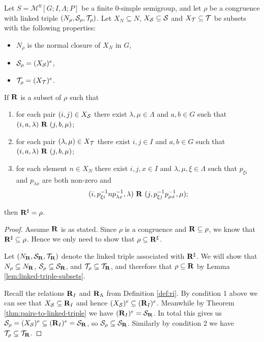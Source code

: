 \begin{theorem}
  \label{thm:linked-triple-to-pairs}
  Let $S = \mathcal{M}^0[G;I,\Lambda;P]$ be a finite 0-simple semigroup, and let
  $\rho$ be a congruence with linked triple
  $(N_\rho, \mathcal{S}_\rho, \mathcal{T}_\rho)$.
  Let $X_N \subseteq N$, $X_{\mathcal{S}} \subseteq \mathcal{S}$ and $X_{\mathcal{T}} \subseteq \mathcal{T}$ be
  subsets with the following properties:
  \begin{itemize}
  \item $N_\rho$ is the normal closure of $X_N$ in $G$,
  \item $\mathcal{S}_\rho = (X_{\mathcal{S}})^e$,
  \item $\mathcal{T}_\rho = (X_{\mathcal{T}})^e$.
  \end{itemize}
  If $\mathbf{R}$ is a subset of $\rho$ such that
  \begin{enumerate}
  \item for each pair $(i, j) \in X_{\mathcal{S}}$ there exist $\lambda, \mu \in \Lambda$
    and $a, b \in G$ such that $(i, a, \lambda) ~\mathbf{R}~ (j, b, \mu)$;
  \item for each pair $(\lambda, \mu) \in X_{\mathcal{T}}$ there exist $i, j \in I$ and
    $a, b \in G$ such that $(i, a, \lambda) ~\mathbf{R}~ (j, b, \mu)$;
  \item for each element $n \in X_N$ there exist $i,j,x \in I$ and $\lambda,
    \mu, \xi \in \Lambda$ such that $p_{\xi i}$ and $p_{\lambda x}$ are both
    non-zero and
    $$(i, p_{\xi i}^{-1} n p_{\lambda x}^{-1}, \lambda) ~\mathbf{R}~
    (j, p_{\xi j}^{-1} p_{\mu x}^{-1}, \mu);$$
  \end{enumerate}
  then $\mathbf{R}^\sharp = \rho$.

  \begin{proof}
    Assume $\mathbf{R}$ is as stated.  Since $\rho$ is a congruence and
    $\mathbf{R} \subseteq \rho$, we know that $\mathbf{R}^\sharp \subseteq \rho$.  Hence we only
    need to show that $\rho \subseteq \mathbf{R}^\sharp$.

    Let $(N_{\mathbf{R}}, \mathcal{S}_{\mathbf{R}}, \mathcal{T}_{\mathbf{R}})$ denote the linked triple associated with
    $\mathbf{R}^\sharp$.  We will show that $N_\rho \subseteq N_{\mathbf{R}}$,
    $\mathcal{S}_\rho \subseteq \mathcal{S}_{\mathbf{R}}$, and $\mathcal{T}_\rho \subseteq \mathcal{T}_{\mathbf{R}}$, and therefore
    that $\rho \subseteq \mathbf{R}$ by Lemma \ref{lem:linked-triple-subsets}.

    Recall the relations $\mathbf{R}_I$ and $\mathbf{R}_\Lambda$ from Definition \ref{def:ri}.
    By condition 1 above we can see that $X_{\mathcal{S}} \subseteq \mathbf{R}_I$ and hence
    $(X_{\mathcal{S}})^e \subseteq (\mathbf{R}_I)^e$.  Meanwhile by Theorem
    \ref{thm:pairs-to-linked-triple} we have $(\mathbf{R}_I)^e = \mathcal{S}_{\mathbf{R}}$.  In
    total this gives us
    $\mathcal{S}_\rho = (X_{\mathcal{S}})^e \subseteq (\mathbf{R}_I)^e = \mathcal{S}_{\mathbf{R}}$, so
    $\mathcal{S}_\rho \subseteq \mathcal{S}_{\mathbf{R}}$.  Similarly by condition 2 we have
    $\mathcal{T}_\rho \subseteq \mathcal{T}_{\mathbf{R}}$.


\end{proof}
\end{theorem}
